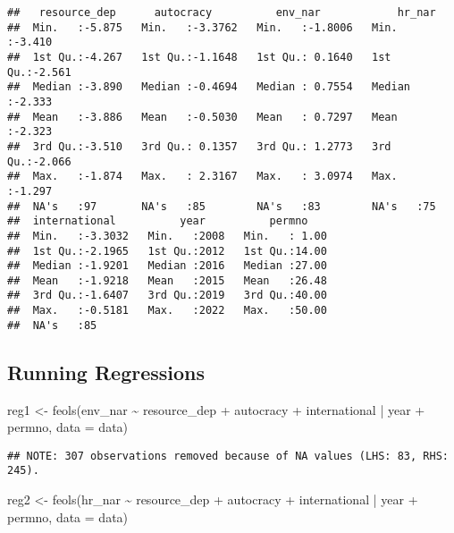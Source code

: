 \documentclass[
]{article}
\newenvironment{Shaded}{\begin{snugshade}}{\end{snugshade}}
\newcommand{\AttributeTok}[1]{\textcolor[rgb]{0.77,0.63,0.00}{#1}}
\newcommand{\FunctionTok}[1]{\textcolor[rgb]{0.00,0.00,0.00}{#1}}
\newcommand{\NormalTok}[1]{#1}
\newcommand{\OtherTok}[1]{\textcolor[rgb]{0.56,0.35,0.01}{#1}}
\newcommand{\SpecialCharTok}[1]{\textcolor[rgb]{0.00,0.00,0.00}{#1}}
\begin{document}
\begin{verbatim}
##   resource_dep      autocracy          env_nar            hr_nar      
##  Min.   :-5.875   Min.   :-3.3762   Min.   :-1.8006   Min.   :-3.410  
##  1st Qu.:-4.267   1st Qu.:-1.1648   1st Qu.: 0.1640   1st Qu.:-2.561  
##  Median :-3.890   Median :-0.4694   Median : 0.7554   Median :-2.333  
##  Mean   :-3.886   Mean   :-0.5030   Mean   : 0.7297   Mean   :-2.323  
##  3rd Qu.:-3.510   3rd Qu.: 0.1357   3rd Qu.: 1.2773   3rd Qu.:-2.066  
##  Max.   :-1.874   Max.   : 2.3167   Max.   : 3.0974   Max.   :-1.297  
##  NA's   :97       NA's   :85        NA's   :83        NA's   :75      
##  international          year          permno     
##  Min.   :-3.3032   Min.   :2008   Min.   : 1.00  
##  1st Qu.:-2.1965   1st Qu.:2012   1st Qu.:14.00  
##  Median :-1.9201   Median :2016   Median :27.00  
##  Mean   :-1.9218   Mean   :2015   Mean   :26.48  
##  3rd Qu.:-1.6407   3rd Qu.:2019   3rd Qu.:40.00  
##  Max.   :-0.5181   Max.   :2022   Max.   :50.00  
##  NA's   :85
\end{verbatim}

\hypertarget{running-regressions}{%
\subsection{Running Regressions}\label{running-regressions}}

\begin{Shaded}
\begin{Highlighting}[]
\NormalTok{reg1 }\OtherTok{\textless{}{-}} \FunctionTok{feols}\NormalTok{(env\_nar }\SpecialCharTok{\textasciitilde{}}\NormalTok{ resource\_dep }\SpecialCharTok{+}\NormalTok{ autocracy }\SpecialCharTok{+}\NormalTok{ international }\SpecialCharTok{|}\NormalTok{ year }\SpecialCharTok{+}\NormalTok{ permno, }
              \AttributeTok{data =}\NormalTok{ data)}
\end{Highlighting}
\end{Shaded}

\begin{verbatim}
## NOTE: 307 observations removed because of NA values (LHS: 83, RHS: 245).
\end{verbatim}

\begin{Shaded}
\begin{Highlighting}[]
\NormalTok{reg2 }\OtherTok{\textless{}{-}} \FunctionTok{feols}\NormalTok{(hr\_nar }\SpecialCharTok{\textasciitilde{}}\NormalTok{ resource\_dep }\SpecialCharTok{+}\NormalTok{ autocracy }\SpecialCharTok{+}\NormalTok{ international }\SpecialCharTok{|}\NormalTok{ year }\SpecialCharTok{+}\NormalTok{ permno, }
              \AttributeTok{data =}\NormalTok{ data)}
\end{Highlighting}
\end{Shaded}
\end{document}
